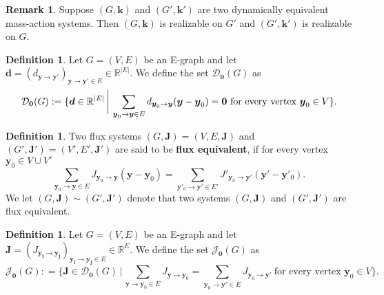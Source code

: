 \documentclass[11pt]{article}
\theoremstyle{plain}
\theoremstyle{definition}
\newtheorem{definition}[theorem]{Definition}
\newtheorem{remark}[theorem]{Remark}
\theoremstyle{remark}
\newcommand\RR{\mathbb{R}}
\newcommand\by{\boldsymbol{y}}
\newcommand\byi{\boldsymbol{y_i}}
\newcommand\byj{\boldsymbol{y_j}}
\newcommand\bk{\boldsymbol{k}}
\newcommand\bJ{\boldsymbol{J}}
\newcommand{\eJ}{\mathcal{J}_{\textbf{0}}}
\newcommand{\mD}{\mathcal{D}_{\textbf{0}}}
\newcommand\bd{\boldsymbol{d}}
\newcommand{\defi}{\textbf}
\begin{document}
\begin{remark}
Suppose $(G, \bk)$ and $(G', \bk')$ are two dynamically equivalent mass-action systems. Then $(G, \bk)$ is realizable on $G'$ and $(G', \bk')$ is realizable on $G$.
\end{remark}

\begin{definition} 
\label{def:d0}
Let $G=(V, E)$ be an E-graph and let $\bd = (d_{\by \to \by'})_{\by \to \by' \in E} \in \RR^{|E|}$. We define the set $\mD(G)$ as
\begin{equation} \notag
\mD (G) :=
\{\bd \in \RR^{|E|} \, \bigg| \, \sum_{\by_0 \to \by \in E} d_{\by_0  \to \by} (\by - \by_0) = \mathbf{0} \ \text{for every vertex } \by_0 \in V
\}.
\end{equation}
\end{definition} 

\begin{definition} 
\label{def:FE}
Two flux systems $(G,\bJ) = (V, E, \bJ)$ and $(G', \bJ') = (V', E',\bJ')$ are said to be \defi{flux equivalent}, if for every vertex $\by_0 \in V \cup V'$
\begin{equation}
\sum_{\by_0 \to \by \in E} J_{\by_0 \to \by} (\by - \by_0) 
= \sum_{\by'_0 \to \by' \in E'} J'_{\by_0 \to \by'} (\by' - \by'_0).
\end{equation}
We let $(G, \bJ) \sim (G', \bJ')$ denote that two systems $(G, \bJ)$ and $(G', \bJ')$ are flux equivalent. 
\end{definition} 

\begin{definition} 
\label{def:j0}
Let $G=(V, E)$ be an E-graph and let $\bJ = ({J}_{\byi \to \byj})_{\byi \to \byj \in E} \in \RR^E$.
We define the set $\eJ (G)$ as
\begin{equation} \label{eq:J_0}
\eJ (G): =
\{{\bJ} \in \mD (G) \, \bigg| \, \sum_{\by \to \by_0 \in E} {J}_{\by \to \by_0} 
= \sum_{\by_0 \to \by' \in E} {J}_{\by_0 \to \by'} \ \text{for every vertex } \by_0 \in V
\}.
\end{equation}
\end{definition} 
\end{document}
